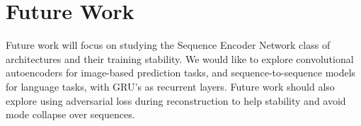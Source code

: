 \section{Future Work}
Future work will focus on studying the Sequence Encoder Network class of architectures and their training stability. We would like to explore convolutional autoencoders for image-based prediction tasks, and sequence-to-sequence models for language tasks, with GRU's as recurrent layers. Future work should also explore using adversarial loss during reconstruction to help stability and avoid mode collapse over sequences.

